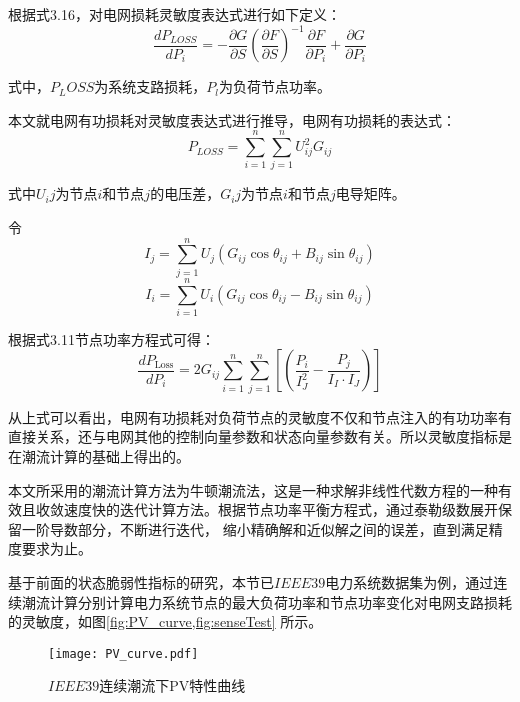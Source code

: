 根据式3.16，对电网损耗灵敏度表达式进行如下定义：
\begin{equation}
  \frac{d P_{LOSS}}{d P_i}=-\frac{\partial G}{\partial S}\left(\frac{\partial F}{\partial S}\right)^{-1} \frac{\partial F}{\partial P_i}+\frac{\partial G}{\partial P_i}
  \end{equation}

式中，$P_LOSS$为系统支路损耗，$P_l$为负荷节点功率。

本文就电网有功损耗对灵敏度表达式进行推导，电网有功损耗的表达式：
\begin{equation}
  P_{L O S S}=\sum_{i=1}^{n} \sum_{j=1}^{n} U_{i j}^{2} G_{i j}
  \end{equation}

式中$U_ij$为节点$i$和节点$j$的电压差，$G_ij$为节点$i$和节点$j$电导矩阵。

令$$I_j = \sum_{j=1}^{n} U_{j}\left(G_{i j} \cos \theta_{i j}+B_{i j} \sin \theta_{i j}\right)$$
$$I_i = \sum_{i=1}^{n} U_{i}\left(G_{i j} \cos \theta_{i j}-B_{i j} \sin \theta_{i j}\right)$$

根据式3.11节点功率方程式可得：
\begin{equation}
  \frac{d P_{\text {Loss}}}{d P_{i}}=2 G_{i j} \sum_{i=1}^{n} \sum_{j=1}^{n}\left[\left(\frac{P_{i}}{I_{J}^{2}}-\frac{P_{j}}{I_{I} \cdot I_{J}}\right)\right]
  \end{equation}

从上式可以看出，电网有功损耗对负荷节点的灵敏度不仅和节点注入的有功功率有直接关系，还与电网其他的控制向量参数和状态向量参数有关。所以灵敏度指标是在潮流计算的基础上得出的。

本文所采用的潮流计算方法为牛顿潮流法，这是一种求解非线性代数方程的一种有效且收敛速度快的迭代计算方法。根据节点功率平衡方程式，通过泰勒级数展开保留一阶导数部分，不断进行迭代，
缩小精确解和近似解之间的误差，直到满足精度要求为止。



基于前面的状态脆弱性指标的研究，本节已$IEEE39$电力系统数据集为例，通过连续潮流计算分别计算电力系统节点的最大负荷功率和节点功率变化对电网支路损耗的灵敏度，如图\ref{fig:PV_curve,fig:senseTest}
所示。
\begin{figure}[H] 
  \centering
  \texttt{[image: PV\_curve.pdf]}
  \caption{$IEEE39$连续潮流下PV特性曲线}
  \label{fig:PV_curve}
\end{figure}

